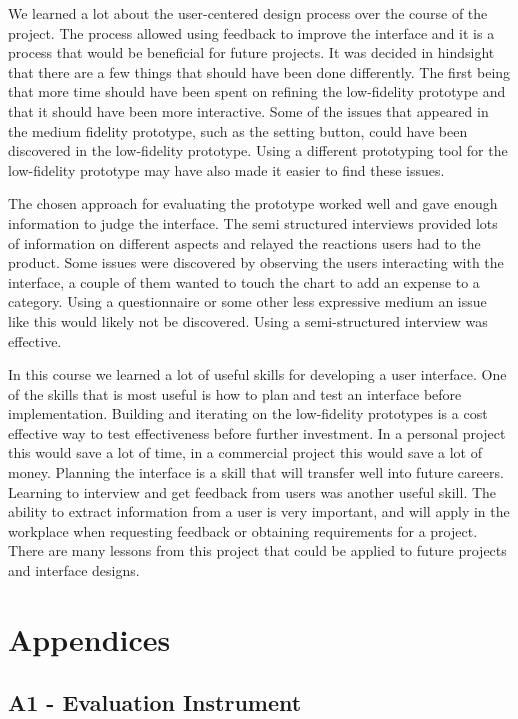 \documentclass{chi2011}
\begin{document}
We learned a lot about the user-centered design process over the course of
the project. The process allowed using feedback to improve the interface
and it is a process that would be beneficial for future projects. It was
decided in hindsight that there are a few things that should have been done
differently. The first being that more time should have been spent on refining
the low-fidelity prototype and that it should have been more interactive. Some
of the issues that appeared in the medium fidelity prototype, such as the
setting button, could have been discovered in the low-fidelity prototype. Using a
different prototyping tool for the low-fidelity prototype may have also made it
easier to find these issues.

The chosen approach for evaluating the prototype worked well and gave enough
information to judge the interface. The semi structured interviews provided
lots of information on different aspects and relayed the reactions users
had to the product. Some issues were discovered by observing the users
interacting with the interface, a couple of them wanted to touch the chart
to add an expense to a category. Using a questionnaire or some other less
expressive medium an issue like this would likely not be discovered. Using a
semi-structured interview was effective.

In this course we learned a lot of useful skills for developing a user
interface. One of the skills that is most useful is how to plan and test an
interface before implementation. Building and iterating on the low-fidelity
prototypes is a cost effective way to test effectiveness before further
investment. In a personal project this would save a lot of time, in a
commercial project this would save a lot of money. Planning the interface is
a skill that will transfer well into future careers. Learning to interview
and get feedback from users was another useful skill. The ability to extract
information from a user is very important, and will apply in the workplace
when requesting feedback or obtaining requirements for a project. There are
many lessons from this project that could be applied to future projects and
interface designs. 

\newpage
\section{Appendices}

	\subsection{A1 - Evaluation Instrument}
\end{document}
